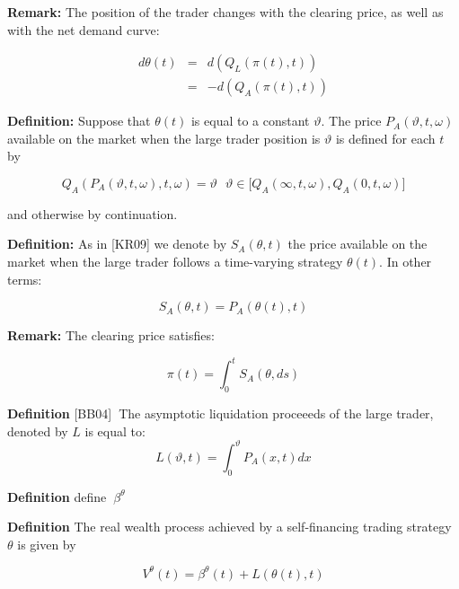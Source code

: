 \documentclass{article}
\begin{document}
\bigskip

\textbf{Remark: }The position of the trader changes with the clearing price,
as well as with the net demand curve:

\begin{eqnarray}
d\theta (t) &=&d(Q_{L}(\pi (t),t))  \label{theta_1} \\
&=&-d(Q_{A}(\pi (t),t))  \label{theta_2}
\end{eqnarray}

\textbf{Definition: }Suppose that $\theta (t)$ is equal to a constant $%
\vartheta $. The price $P_{A}(\vartheta ,t,\omega )$ available on the market
when the large trader position is $\vartheta $ is defined for each $t$ by

\begin{equation*}
Q_{A}(P_{A}(\vartheta ,t,\omega ),t,\omega )=\vartheta \text{ \ \ }\vartheta
\in \lbrack Q_{A}(\infty ,t,\omega ),Q_{A}(0,t,\omega )]
\end{equation*}

and otherwise by continuation.

\textbf{Definition:} As in [KR09] we denote by $S_{A}(\theta ,t)$ the price
available on the market when the large trader follows a time-varying
strategy $\theta (t)$. In other terms:

\begin{equation*}
S_{A}(\theta ,t)=P_{A}(\theta (t),t)
\end{equation*}

\textbf{Remark: }The clearing price satisfies:

\begin{equation*}
\pi (t)=\int_{0}^{t}S_{A}(\theta ,ds)
\end{equation*}

\textbf{Definition }[BB04]\textbf{\ }The asymptotic liquidation proceeeds of
the large trader, denoted by $L$ is equal to:\
\begin{equation*}
L(\vartheta ,t)=\int_{0}^{\vartheta }P_{A}(x,t)dx
\end{equation*}

\textbf{Definition }define\textbf{\ }$\beta ^{\theta }$\bigskip

\textbf{Definition} The real wealth process achieved by a self-financing
trading strategy $\theta $ is given by

\begin{equation*}
V^{\theta }(t)=\beta ^{\theta }(t)+L(\theta (t),t)
\end{equation*}
\end{document}
